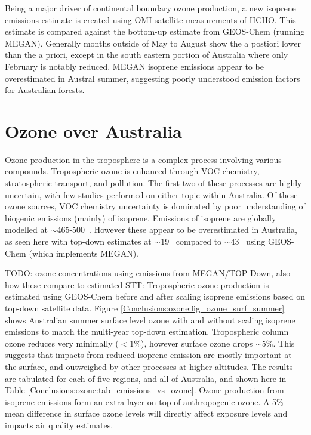   Being a major driver of continental boundary ozone production, a new isoprene emissions estimate is created using OMI satellite measurements of HCHO.
  This estimate is compared against the bottom-up estimate from GEOS-Chem (running MEGAN).
  Generally months outside of May to August show the a postiori lower than the a priori, except in the south eastern portion of Australia where only February is notably reduced.
  MEGAN isoprene emissions appear to be overestimated in Austral summer, suggesting poorly understood emission factors for Australian forests.

\section{Ozone over Australia}
\label{Conclusions:ozone}
  
  Ozone production in the troposphere is a complex process involving various compounds.
  Tropospheric ozone is enhanced through VOC chemistry, stratospheric transport, and pollution.
  The first two of these processes are highly uncertain, with few studies performed on either topic within Australia.
  Of these ozone sources, VOC chemistry uncertainty is dominated by poor understanding of biogenic emissions (mainly) of isoprene.
  Emissions of isoprene are globally modelled at $\sim$465-500\tgcpyr  ~\parencite{Guenther2006, Messina2016}. 
  However these appear to be overestimated in Australia, as seen here with top-down estimates at $\sim 19$ \tgcpyr  ~compared to $\sim 43$ \tgcpyr  ~using GEOS-Chem (which implements MEGAN).
  
  TODO: ozone concentrations using emissions from MEGAN/TOP-Down, also how these compare to estimated STT:
  Tropospheric ozone production is estimated using GEOS-Chem before and after scaling isoprene emissions based on top-down satellite data.
  Figure \ref{Conclusions:ozone:fig_ozone_surf_summer} shows Australian summer surface level ozone with and without scaling isoprene emissions to match the multi-year top-down estimation.
  Tropospheric column ozone reduces very minimally ($<1\%$), however surface ozone drops $\sim 5\%$.
  This suggests that impacts from reduced isoprene emission are mostly important at the surface, and outweighed by other processes at higher altitudes.
  The results are tabulated for each of five regions, and all of Australia, and shown here in Table \ref{Conclusions:ozone:tab_emissions_vs_ozone}.
  Ozone production from isoprene emissions form an extra layer on top of anthropogenic ozone. 
  A 5\% mean difference in surface ozone levels will directly affect exposure levels and impacts air quality estimates. 
  
